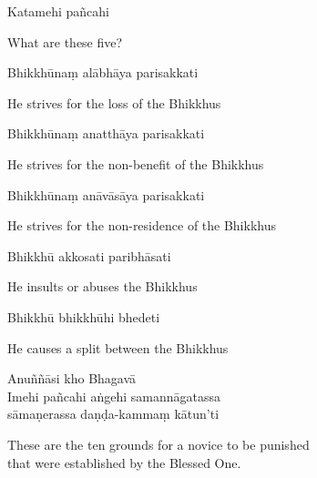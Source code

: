 Katamehi pañcahi

\begin{english}
  What are these five?
\end{english}

Bhikkhūnaṃ alābhāya parisakkati

\begin{english}
  He strives for the loss of the Bhikkhus
\end{english}

Bhikkhūnaṃ anatthāya parisakkati

\begin{english}
  He strives for the non-benefit of the Bhikkhus
\end{english}

Bhikkhūnaṃ anāvāsāya parisakkati

\begin{english}
  He strives for the non-residence of the Bhikkhus
\end{english}

Bhikkhū akkosati paribhāsati

\begin{english}
  He insults or abuses the Bhikkhus
\end{english}

Bhikkhū bhikkhūhi bhedeti

\begin{english}
  He causes a split between the Bhikkhus
\end{english}

Anuññāsi kho Bhagavā\\
Imehi pañcahi aṅgehi samannāgatassa\\
sāmaṇerassa daṇḍa-kammaṃ kātun'ti

\begin{english}
  These are the ten grounds for a novice to be punished\\
  that were established by the Blessed One.
\end{english}


